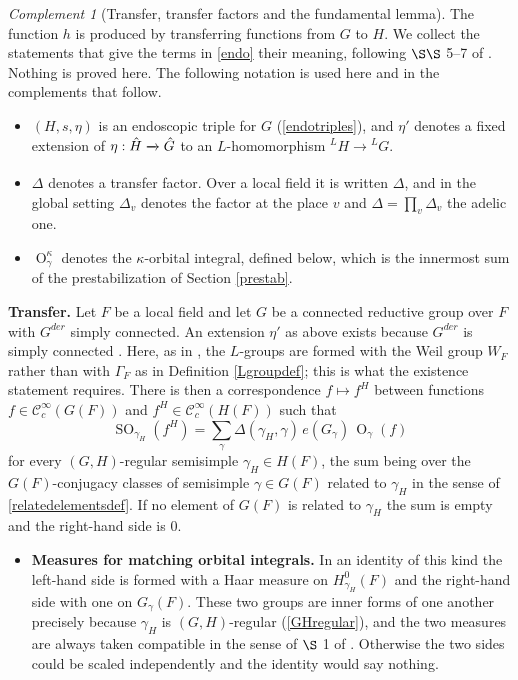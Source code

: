 \documentclass[11pt,a4paper]{article}
\theoremstyle{definition}
\theoremstyle{plain}
\theoremstyle{remark}
\newtheorem{Rc}[shared]{Complement}
\theoremstyle{plain}
\DeclareMathOperator{\Or}{O}
\DeclareMathOperator{\SO}{SO}
\begin{document}
\begin{Rc}[Transfer, transfer factors and the fundamental lemma]\label{transferFL}
    The function $h$ is produced by transferring functions from $G$ to $H$. We collect the statements that give the terms in \eqref{endo} their meaning, following $\S\S$ 5--7 of \cite{MR858284}. Nothing is proved here. The following notation is used here and in the complements that follow.
    \begin{itemize}
        \item $(H,s,\eta)$ is an endoscopic triple for $G$ (\ref{endotriples}), and $\eta'$ denotes a fixed extension of $\eta : \Hat{H} \xrightarrow[]{} \Hat{G}$ to an $L$-homomorphism ${}^L H \xrightarrow[]{} {}^L G$.
        \item $\Delta$ denotes a transfer factor. Over a local field it is written $\Delta$, and in the global setting $\Delta_v$ denotes the factor at the place $v$ and $\Delta = \prod_v \Delta_v$ the adelic one.
        \item $\Or^{\kappa}_{\gamma}$ denotes the $\kappa$-orbital integral, defined below, which is the innermost sum of the prestabilization of Section \ref{prestab}.
    \end{itemize}

    \textbf{Transfer.} Let $F$ be a local field and let $G$ be a connected reductive group over $F$ with $G^{der}$ simply connected. An extension $\eta'$ as above exists because $G^{der}$ is simply connected \cite{MR540901}. Here, as in \cite{MR1044820}, the $L$-groups are formed with the Weil group $W_F$ rather than with $\Gamma_F$ as in Definition \ref{Lgroupdef}; this is what the existence statement requires. There is then a correspondence $f \mapsto f^H$ between functions $f \in \mathcal{C}_c^{\infty}(G(F))$ and $f^H \in \mathcal{C}_c^{\infty}(H(F))$ such that
    $$\SO_{\gamma_H}(f^H) = \sum_{\gamma} \Delta(\gamma_H, \gamma) \, e(G_{\gamma}) \, \Or_{\gamma}(f)$$
    for every $(G,H)$-regular semisimple $\gamma_H \in H(F)$, the sum being over the $G(F)$-conjugacy classes of semisimple $\gamma \in G(F)$ related to $\gamma_H$ in the sense of \ref{relatedelementsdef}. If no element of $G(F)$ is related to $\gamma_H$ the sum is empty and the right-hand side is $0$.
    \begin{itemize}
        \item \textbf{Measures for matching orbital integrals.} In an identity of this kind the left-hand side is formed with a Haar measure on $H_{\gamma_H}^0(F)$ and the right-hand side with one on $G_{\gamma}(F)$. These two groups are inner forms of one another precisely because $\gamma_H$ is $(G,H)$-regular (\ref{GHregular}), and the two measures are always taken compatible in the sense of $\S$ 1 of \cite{MR942522}. Otherwise the two sides could be scaled independently and the identity would say nothing.
    \end{itemize}


\end{Rc}
\end{document}
